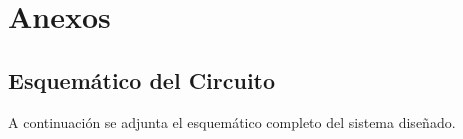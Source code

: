 \clearpage

\chapter{Anexos}
\label{chap:anexos}

\section{Esquemático del Circuito}
\label{anexo:esquematico}

A continuación se adjunta el esquemático completo del sistema diseñado.



